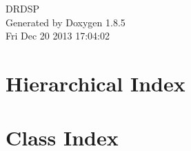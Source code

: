 \documentclass[twoside]{book}
\newcommand{\clearemptydoublepage}{%
  \newpage{\pagestyle{empty}\cleardoublepage}%
}
\begin{document}
\hypersetup{pageanchor=false}
\begin{titlepage}
\vspace*{7cm}
\begin{center}%
{\Large D\-R\-D\-S\-P }\\
\vspace*{1cm}
{\large Generated by Doxygen 1.8.5}\\
\vspace*{0.5cm}
{\small Fri Dec 20 2013 17:04:02}\\
\end{center}
\end{titlepage}
\clearemptydoublepage
\tableofcontents
\clearemptydoublepage
{}
\hypersetup{pageanchor=true}

\chapter{Hierarchical Index}

\chapter{Class Index}

\end{document}
